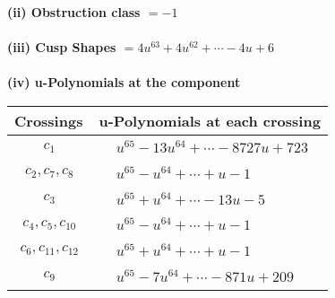 \documentclass[1p]{elsarticle_modified}
\theoremstyle{definition}
\begin{document}
\flushleft \textbf{(ii) Obstruction class $= -1$}\\~\\
\flushleft \textbf{(iii) Cusp Shapes $= 4 u^{63}+4 u^{62}+\cdots-4 u+6$}\\~\\
\newpage\renewcommand{\arraystretch}{1}
\flushleft \textbf{(iv) u-Polynomials at the component}\newline \\
\begin{tabular}{m{50pt}|m{274pt}}
Crossings & \hspace{64pt}u-Polynomials at each crossing \\
\hline $$\begin{aligned}c_{1}\end{aligned}$$&$\begin{aligned}
&u^{65}-13 u^{64}+\cdots-8727 u+723
\end{aligned}$\\
\hline $$\begin{aligned}c_{2},c_{7},c_{8}\end{aligned}$$&$\begin{aligned}
&u^{65}- u^{64}+\cdots+u-1
\end{aligned}$\\
\hline $$\begin{aligned}c_{3}\end{aligned}$$&$\begin{aligned}
&u^{65}+u^{64}+\cdots-13 u-5
\end{aligned}$\\
\hline $$\begin{aligned}c_{4},c_{5},c_{10}\end{aligned}$$&$\begin{aligned}
&u^{65}- u^{64}+\cdots+u-1
\end{aligned}$\\
\hline $$\begin{aligned}c_{6},c_{11},c_{12}\end{aligned}$$&$\begin{aligned}
&u^{65}+u^{64}+\cdots+u-1
\end{aligned}$\\
\hline $$\begin{aligned}c_{9}\end{aligned}$$&$\begin{aligned}
&u^{65}-7 u^{64}+\cdots-871 u+209
\end{aligned}$\\
\hline
\end{tabular}\\~\\
\end{document}
